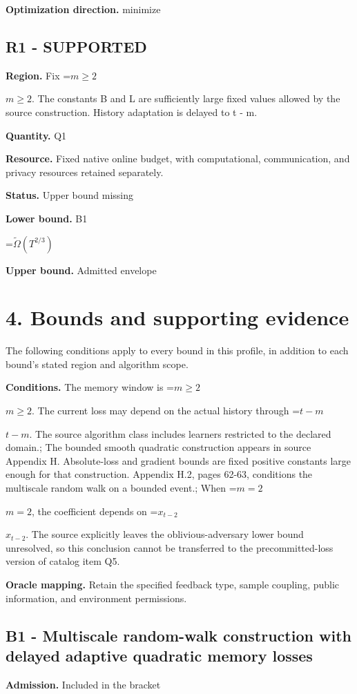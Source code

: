 \documentclass[10pt,a4paper]{article}
\newcommand{\AtlasMath}[1]{\par\begingroup\centering\setbox0=\hbox{$\displaystyle #1$}\ifdim\wd0>1.4\linewidth\typeout{ATLAS WIDE FORMULA: \the\wd0}\fi\ifdim\wd0>\linewidth\resizebox{\linewidth}{!}{\box0}\else\box0\fi\par\endgroup}
\newcommand{\AtlasInlineMath}[1]{\begingroup\setbox0=\hbox{$#1$}\ifdim\wd0>.4\linewidth\endgroup\AtlasMath{#1}\else\endgroup$#1$\fi}
\begin{document}
\textbf{Optimization direction.} minimize

\subsection{R1 - SUPPORTED}
\textbf{Region.} Fix \AtlasInlineMath{m\ge 2}. The constants B and L are sufficiently large fixed values allowed by the source construction. History adaptation is delayed to t - m.

\textbf{Quantity.} Q1

\textbf{Resource.} Fixed native online budget, with computational, communication, and privacy resources retained separately.

\textbf{Status.} Upper bound missing

\textbf{Lower bound.} B1

\AtlasMath{\widetilde\Omega(T^{2/3})}
\textbf{Upper bound.} Admitted envelope

\section{4. Bounds and supporting evidence}
The following conditions apply to every bound in this profile, in addition to each bound's stated region and algorithm scope.

\textbf{Conditions.} The memory window is \AtlasInlineMath{m\ge2}. The current loss may depend on the actual history through \AtlasInlineMath{t-m}. The source algorithm class includes learners restricted to the declared domain.; The bounded smooth quadratic construction appears in source Appendix H. Absolute-loss and gradient bounds are fixed positive constants large enough for that construction. Appendix H.2, pages 62-63, conditions the multiscale random walk on a bounded event.; When \AtlasInlineMath{m=2}, the coefficient depends on \AtlasInlineMath{x_{t-2}}. The source explicitly leaves the oblivious-adversary lower bound unresolved, so this conclusion cannot be transferred to the precommitted-loss version of catalog item Q5.

\textbf{Oracle mapping.} Retain the specified feedback type, sample coupling, public information, and environment permissions.

\subsection{B1 - Multiscale random-walk construction with delayed adaptive quadratic memory losses}
\textbf{Admission.} Included in the bracket
\end{document}
